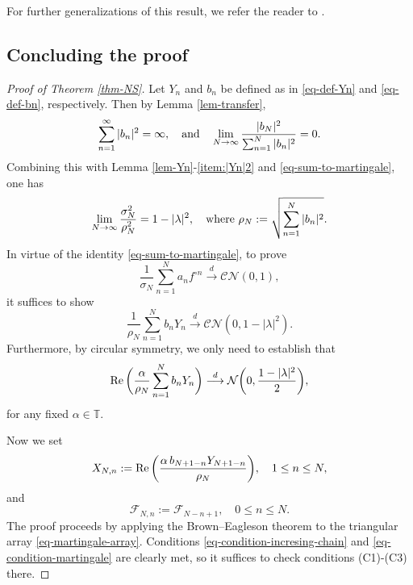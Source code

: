 \documentclass[11pt, reqno]{amsart}
\theoremstyle{definition}
\newtheorem*{Brown-Eagleson Theorem}{The Brown-Eagleson Theorem}
\newcommand{\T}{\mathbb T}
\newcommand{\cal}{\mathcal}
\begin{document}
	For further generalizations of this result, we refer the reader to \cite{Eag75}.
	


	\subsection{Concluding the proof}

	\begin{proof}[Proof of Theorem \ref{thm-NS}]
		Let $Y_n$ and $b_n$ be defined as in \eqref{eq-def-Yn} and \eqref{eq-def-bn}, respectively. Then by Lemma \ref{lem-transfer}, 
		\begin{align}\label{eq-bn-Lindberg}
			\sum_{n=1}^\infty |b_n|^2=\infty,\quad {\rm and} \quad \lim_{N\to \infty} \frac{|b_N|^2}{\sum_{n=1}^N |b_n|^2}= 0.
		\end{align}
		Combining this with Lemma \ref{lem-Yn}-\ref{item:|Yn|2} and \eqref{eq-sum-to-martingale}, one has $$\lim_{N\to \infty} \frac{\sigma^2_N}{\rho_N^2} = 1-|\lambda|^2, \quad {\rm where}\,\, \rho_N:= \sqrt{\sum_{n=1}^N |b_n|^2}.$$ In virtue of the identity \eqref{eq-sum-to-martingale}, to prove $$\frac{1}{\sigma_N}\sum_{n=1}^N a_nf^{\circ n}\stackrel{d}{\longrightarrow}\cal{CN}(0,1),$$ it suffices to show
		$$\frac{1}{\rho_N}\sum_{n=1}^N b_n Y_n \stackrel{d}{\longrightarrow} \mathcal{CN}(0,1-|\lambda|^2).$$ Furthermore, by circular symmetry, we only need to establish that $${\rm Re}\,\bigg(\frac{\alpha}{\rho_N}\sum_{n=1}^N b_n Y_n\bigg) \stackrel{d}{\longrightarrow} \mathcal N\bigg(0,\frac{1-|\lambda|^2}{2}\bigg),$$ for any fixed $\alpha\in \T$.
		
		
		Now we set $$X_{N,n}:= {\rm Re}\, \bigg( \frac{\alpha \,b_{N+1-n} Y_{N+1-n}}{\rho_N}\bigg),\quad 1\leq n\leq N,$$ and $$\mathcal{F}_{N,n} := \mathscr{F}_{N-n+1},\quad 0\leq n \leq N.$$ The proof proceeds by applying the Brown--Eagleson theorem to the triangular array \eqref{eq-martingale-array}. Conditions \eqref{eq-condition-incresing-chain} and \eqref{eq-condition-martingale} are clearly met, so it suffices to check conditions (C1)-(C3) there.
	


\end{proof}
\end{document}
